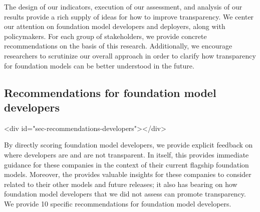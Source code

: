 \documentclass[screen, authorversion, acmsmall]{acmart}
\begin{document}
The design of our indicators, execution of our assessment, and analysis of our results provide a rich supply of ideas for how to improve transparency. 
We center our attention on foundation model developers and deployers, along with policymakers.
For each group of stakeholders, we provide concrete recommendations on the basis of this research.
Additionally, we encourage researchers to scrutinize our overall approach in order to clarify how transparency for foundation models can be better understood in the future. 

\hypertarget{recommendations-developers}{\subsection{Recommendations for foundation model developers}}
<div id="sec-recommendations-developers"></div>

By directly scoring foundation model developers, we provide explicit feedback on where developers are and are not transparent.
In itself, this provides immediate guidance for these \numcompanies companies in the context of their current flagship foundation models.
Moreover, the \projectname provides valuable insights for these companies to consider related to their other models and future releases; it also has bearing on how foundation model developers that we did not assess can promote transparency. We provide 10 specific recommendations for foundation model developers.
\end{document}
